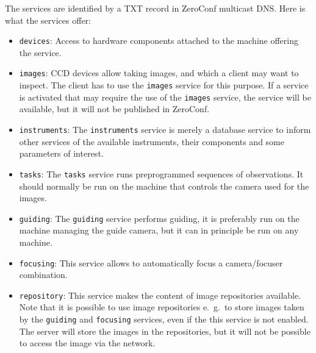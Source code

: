 The services are identified by a TXT record in ZeroConf multicast DNS.
Here is what the services offer:
\begin{itemize}
\item \texttt{devices}: Access to hardware components attached to the
machine offering the service.
\item \texttt{images}: CCD devices allow taking images, and which a 
client may want to inspect.
The client has to use the \texttt{images} service for this purpose.
If a service is activated that may require the use of the \texttt{images}
service, the service will be available, but it will not be published in
ZeroConf.
\item \texttt{instruments}: The \texttt{instruments} service is merely
a database service to inform other services of the available instruments,
their components and some parameters of interest.
\item \texttt{tasks}: The \texttt{tasks} service runs preprogrammed
sequences of observations. It should normally be run on the machine that
controls the camera used for the images.
\item \texttt{guiding}: The \texttt{guiding} service performs guiding,
it is preferably run on the machine managing the guide camera, but
it can in principle be run on any machine.
\item \texttt{focusing}: This service allows to automatically focus a
camera/focuser combination.
\item \texttt{repository}: This service makes the content of image
repositories available.
Note that it is possible to use image repositories e.~g.~to store images
taken by the \texttt{guiding} and \texttt{focusing} services, even if
the this service is not enabled.
The server will store the images in the repositories, but it will not
be possible to access the image via the network.
\end{itemize}


